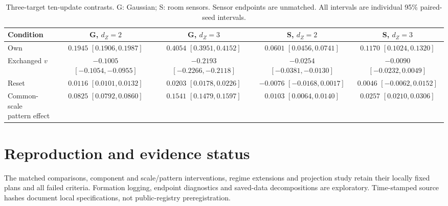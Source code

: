 \begin{table}[ht]\centering\small
\caption{Three-target ten-update contrasts. G: Gaussian; S: room sensors. Sensor endpoints are unmatched. All intervals are individual 95\% paired-seed intervals.}
\label{tab:targets}\label{tab:vb}\label{tab:vc}
\begin{tabular}{lcccc}\toprule
Condition & G, $d_Z=2$ & G, $d_Z=3$ & S, $d_Z=2$ & S, $d_Z=3$\\
\midrule
Own & \shortstack{$0.1945$\\$[0.1906,0.1987]$} & \shortstack{$0.4054$\\$[0.3951,0.4152]$} & \shortstack{$0.0601$\\$[0.0456,0.0741]$} & \shortstack{$0.1170$\\$[0.1024,0.1320]$}\\
Exchanged $v$ & \shortstack{$-0.1005$\\$[-0.1054,-0.0955]$} & \shortstack{$-0.2193$\\$[-0.2266,-0.2118]$} & \shortstack{$-0.0254$\\$[-0.0381,-0.0130]$} & \shortstack{$-0.0090$\\$[-0.0232,0.0049]$}\\
Reset & \shortstack{$0.0116$\\$[0.0101,0.0132]$} & \shortstack{$0.0203$\\$[0.0178,0.0226]$} & \shortstack{$-0.0076$\\$[-0.0168,0.0017]$} & \shortstack{$0.0046$\\$[-0.0062,0.0152]$}\\
\shortstack{Common-scale\\pattern effect} & \shortstack{$0.0825$\\$[0.0792,0.0860]$} & \shortstack{$0.1541$\\$[0.1479,0.1597]$} & \shortstack{$0.0103$\\$[0.0064,0.0140]$} & \shortstack{$0.0257$\\$[0.0210,0.0306]$}\\
\bottomrule\end{tabular}\end{table}

\section{Reproduction and evidence status}
\label{app:status}
The matched comparisons, component and scale/pattern interventions, regime extensions and projection study retain their locally fixed plans and all failed criteria. Formation logging, endpoint diagnostics and saved-data decompositions are exploratory. Time-stamped source hashes document local specifications, not public-registry preregistration.

